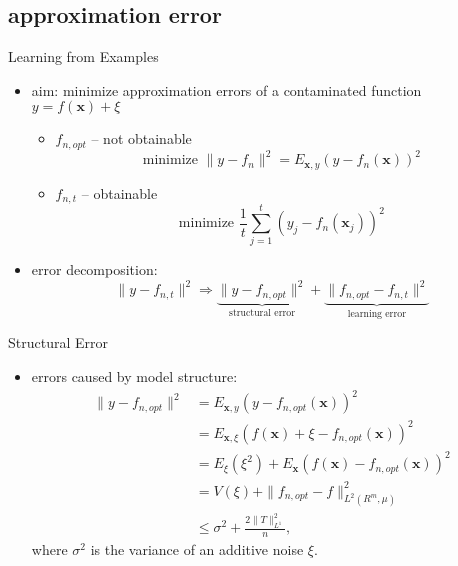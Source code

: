 \documentclass[fleqn,aspectratio=1610]{beamer}
\begin{document}
\subsection{approximation error}
\label{sec:org1ddbfe9}
\begin{frame}[label={sec:orgf5723c7}]{Learning from Examples}
\begin{itemize}
\item \alert{aim:} minimize approximation errors of
a contaminated function \(y=f(\boldsymbol{x})+\xi\) 
\begin{itemize}
\item \(f_{n,opt}\) -- not obtainable
\begin{equation}
  \text{minimize }
  \|y-f_{n}\|^{2}
  =E_{\boldsymbol{x},y}(y-f_{n}(\boldsymbol{x}))^{2}\;
\end{equation}
\item \(f_{n,t}\) -- obtainable
\begin{equation}
  \text{minimize }
  \frac{1}{t}\sum_{j=1}^{t}(y_{j}-f_{n}(\boldsymbol{x}_{j}))^{2}\;
\end{equation}
\end{itemize}
\item \alert{error decomposition:}
\begin{equation}
  \|y-f_{n,t}\|^{2}\Rightarrow
  \underbrace{\|y-f_{n,opt}\|^{2}}_{\text{structural error}}+
  \underbrace{\|f_{n,opt}-f_{n,t}\|^{2}}_{\text{learning error}}
\end{equation}
\end{itemize}
\end{frame}

\begin{frame}[label={sec:org05da54f}]{Structural Error}
\begin{itemize}
\item errors caused by model structure:
\begin{align}
  \|y-f_{n,opt}\|^{2}
  &=E_{\boldsymbol{x},y}(y-f_{n,opt}(\boldsymbol{x}))^{2}\\
  &=E_{\boldsymbol{x},\xi}(f(\boldsymbol{x})+\xi
    -f_{n,opt}(\boldsymbol{x}))^{2}\\
  &=E_{\xi}(\xi^2)+
    E_{\boldsymbol{x}}(f(\boldsymbol{x})
    -f_{n,opt}(\boldsymbol{x}))^{2}\\
  &=V(\xi)+\|f_{n,opt}-f\|^{2}_{L^{2}(R^{m},\mu)}\\
  &\leq\sigma^{2}+\frac{2\|T\|_{L^1}^{2}}{n},
\end{align}
where \(\sigma^{2}\) is the variance of an additive noise \(\xi\).
\end{itemize}
\end{frame}
\end{document}
